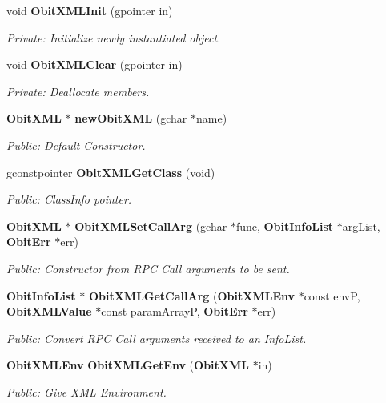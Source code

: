 \begin{CompactItemize}
\item 
void {\bf Obit\-XMLInit} (gpointer in)
\begin{CompactList}\small\item\em Private: Initialize newly instantiated object. \item\end{CompactList}\item 
void {\bf Obit\-XMLClear} (gpointer in)
\begin{CompactList}\small\item\em Private: Deallocate members. \item\end{CompactList}\item 
{\bf Obit\-XML} $\ast$ {\bf new\-Obit\-XML} (gchar $\ast$name)
\begin{CompactList}\small\item\em Public: Default Constructor. \item\end{CompactList}\item 
gconstpointer {\bf Obit\-XMLGet\-Class} (void)
\begin{CompactList}\small\item\em Public: Class\-Info pointer. \item\end{CompactList}\item 
{\bf Obit\-XML} $\ast$ {\bf Obit\-XMLSet\-Call\-Arg} (gchar $\ast$func, {\bf Obit\-Info\-List} $\ast$arg\-List, {\bf Obit\-Err} $\ast$err)
\begin{CompactList}\small\item\em Public: Constructor from RPC Call arguments to be sent. \item\end{CompactList}\item 
{\bf Obit\-Info\-List} $\ast$ {\bf Obit\-XMLGet\-Call\-Arg} ({\bf Obit\-XMLEnv} $\ast$const env\-P, {\bf Obit\-XMLValue} $\ast$const param\-Array\-P, {\bf Obit\-Err} $\ast$err)
\begin{CompactList}\small\item\em Public: Convert RPC Call arguments received to an Info\-List. \item\end{CompactList}\item 
{\bf Obit\-XMLEnv} {\bf Obit\-XMLGet\-Env} ({\bf Obit\-XML} $\ast$in)
\begin{CompactList}\small\item\em Public: Give XML Environment. \item\end{CompactList}\item 

\end{CompactItemize}
